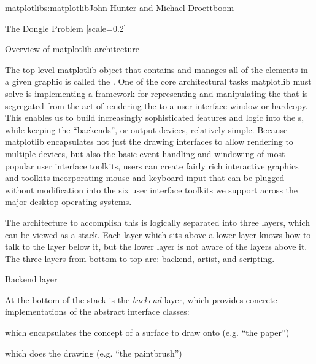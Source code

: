 \begin{aosachapter}{matplotlib}{s:matplotlib}{John Hunter and Michael Droettboom}
\begin{aosasect1}{The Dongle Problem}
[scale=0.2]

\end{aosasect1}

\begin{aosasect1}{Overview of matplotlib architecture}

The top level matplotlib object that contains and manages all of the
elements in a given graphic is called the .  One of the
core architectural tasks matplotlib must solve is implementing a
framework for representing and manipulating the  that
is segregated from the act of rendering the  to a user
interface window or hardcopy.  This enables us to build increasingly
sophisticated features and logic into the s, while
keeping the ``backends'', or output devices, relatively simple.
Because matplotlib encapsulates not just the drawing interfaces to
allow rendering to multiple devices, but also the basic event
handling and windowing of most popular user interface toolkits,
users can create fairly rich interactive graphics and toolkits
incorporating mouse and keyboard input that can be plugged without
modification into the six user interface toolkits we support across
the major desktop operating systems.

The architecture to accomplish this is logically separated into three
layers, which can be viewed as a stack.  Each layer which sits above a
lower layer knows how to talk to the layer below it, but the lower
layer is not aware of the layers above it.  The three layers from
bottom to top are: backend, artist, and scripting.


\begin{aosasect2}{Backend layer}

At the bottom of the stack is the \emph{backend} layer, which provides
concrete implementations of the abstract interface classes:
\begin{aosaitemize}
\item {} which encapsulates the concept of
  a surface to draw onto (e.g. ``the paper'')

\item {} which does the drawing (e.g. ``the paintbrush'')


\end{aosaitemize}
\end{aosasect2}
\end{aosasect1}
\end{aosachapter}
